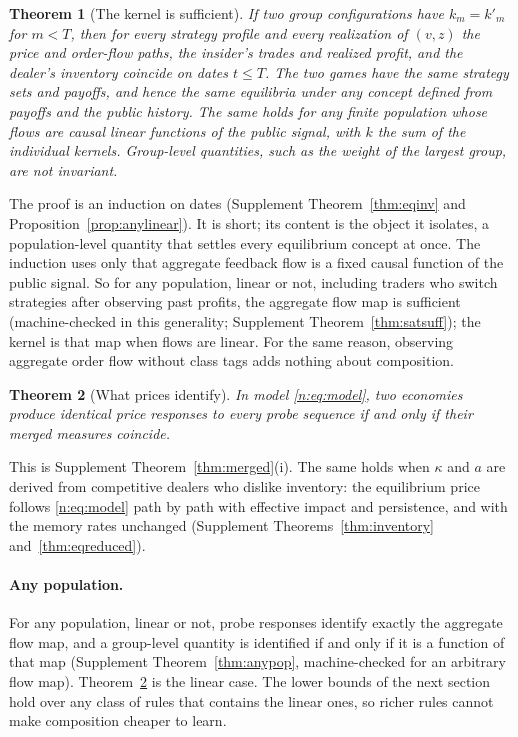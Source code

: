 \documentclass[12pt]{article}
\newtheorem{theorem}{Theorem}[section]
\theoremstyle{definition}
\theoremstyle{remark}
\begin{document}
\begin{theorem}[The kernel is sufficient]\label{n:suff}
If two group configurations have $k_m=k'_m$ for $m<T$, then for every strategy profile and every realization of $(v,z)$ the price and order-flow paths, the insider's trades and realized profit, and the dealer's inventory coincide on dates $t\le T$. The two games have the same strategy sets and payoffs, and hence the same equilibria under any concept defined from payoffs and the public history. The same holds for any finite population whose flows are causal linear functions of the public signal, with $k$ the sum of the individual kernels. Group-level quantities, such as the weight of the largest group, are not invariant.
\end{theorem}

The proof is an induction on dates (Supplement Theorem~\ref{thm:eqinv} and Proposition~\ref{prop:anylinear}). It is short; its content is the object it isolates, a population-level quantity that settles every equilibrium concept at once. The induction uses only that aggregate feedback flow is a fixed causal function of the public signal. So for any population, linear or not, including traders who switch strategies after observing past profits, the aggregate flow map is sufficient (machine-checked in this generality; Supplement Theorem~\ref{thm:satsuff}); the kernel is that map when flows are linear. For the same reason, observing aggregate order flow without class tags adds nothing about composition.

\begin{theorem}[What prices identify]\label{n:ident}
In model \eqref{n:eq:model}, two economies produce identical price responses to every probe sequence if and only if their merged measures coincide.
\end{theorem}

This is Supplement Theorem~\ref{thm:merged}(i). The same holds when $\kappa$ and $a$ are derived from competitive dealers who dislike inventory: the equilibrium price follows \eqref{n:eq:model} path by path with effective impact and persistence, and with the memory rates unchanged (Supplement Theorems~\ref{thm:inventory} and~\ref{thm:eqreduced}).

\paragraph{Any population.} For any population, linear or not, probe responses identify exactly the aggregate flow map, and a group-level quantity is identified if and only if it is a function of that map (Supplement Theorem~\ref{thm:anypop}, machine-checked for an arbitrary flow map). Theorem~\ref{n:ident} is the linear case. The lower bounds of the next section hold over any class of rules that contains the linear ones, so richer rules cannot make composition cheaper to learn.
\end{document}
